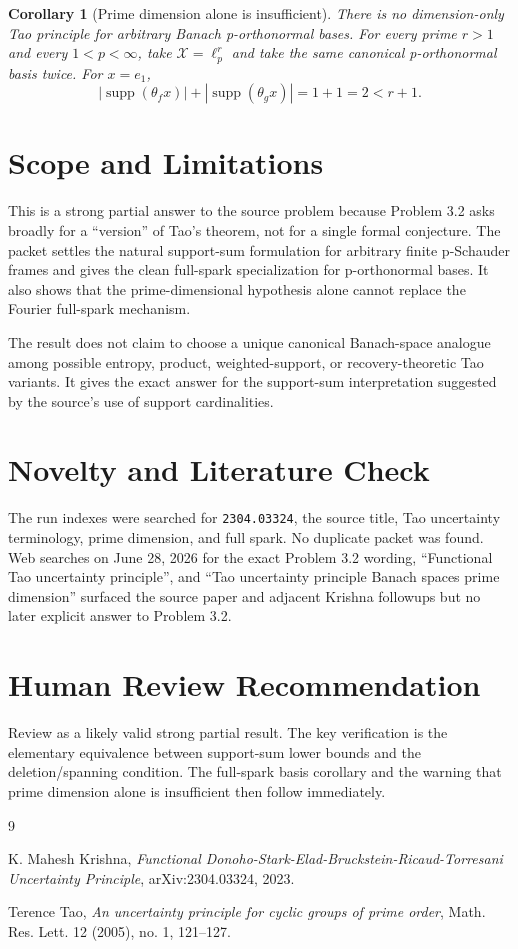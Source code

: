 \documentclass[11pt]{article}
\newtheorem{corollary}{Corollary}
\newcommand{\X}{\mathcal X}
\newcommand{\supp}{\operatorname{supp}}
\begin{document}
\begin{corollary}[Prime dimension alone is insufficient]
There is no dimension-only Tao principle for arbitrary Banach p-orthonormal bases. For every prime $r>1$ and every $1<p<\infty$, take $\X=\ell_p^r$ and take the same canonical p-orthonormal basis twice. For $x=e_1$,
\[
|\supp(\theta_f x)|+|\supp(\theta_g x)|=1+1=2<r+1.
\]
\end{corollary}

\section*{Scope and Limitations}

This is a strong partial answer to the source problem because Problem 3.2 asks broadly for a ``version'' of Tao's theorem, not for a single formal conjecture. The packet settles the natural support-sum formulation for arbitrary finite p-Schauder frames and gives the clean full-spark specialization for p-orthonormal bases. It also shows that the prime-dimensional hypothesis alone cannot replace the Fourier full-spark mechanism.

The result does not claim to choose a unique canonical Banach-space analogue among possible entropy, product, weighted-support, or recovery-theoretic Tao variants. It gives the exact answer for the support-sum interpretation suggested by the source's use of support cardinalities.

\section*{Novelty and Literature Check}

The run indexes were searched for \texttt{2304.03324}, the source title, Tao uncertainty terminology, prime dimension, and full spark. No duplicate packet was found. Web searches on June 28, 2026 for the exact Problem 3.2 wording, ``Functional Tao uncertainty principle'', and ``Tao uncertainty principle Banach spaces prime dimension'' surfaced the source paper and adjacent Krishna followups but no later explicit answer to Problem 3.2.

\section*{Human Review Recommendation}

Review as a likely valid strong partial result. The key verification is the elementary equivalence between support-sum lower bounds and the deletion/spanning condition. The full-spark basis corollary and the warning that prime dimension alone is insufficient then follow immediately.

\begin{thebibliography}{9}

K. Mahesh Krishna,
\emph{Functional Donoho-Stark-Elad-Bruckstein-Ricaud-Torresani Uncertainty Principle},
arXiv:2304.03324, 2023.

Terence Tao,
\emph{An uncertainty principle for cyclic groups of prime order},
Math. Res. Lett. 12 (2005), no. 1, 121--127.

\end{thebibliography}
\end{document}
